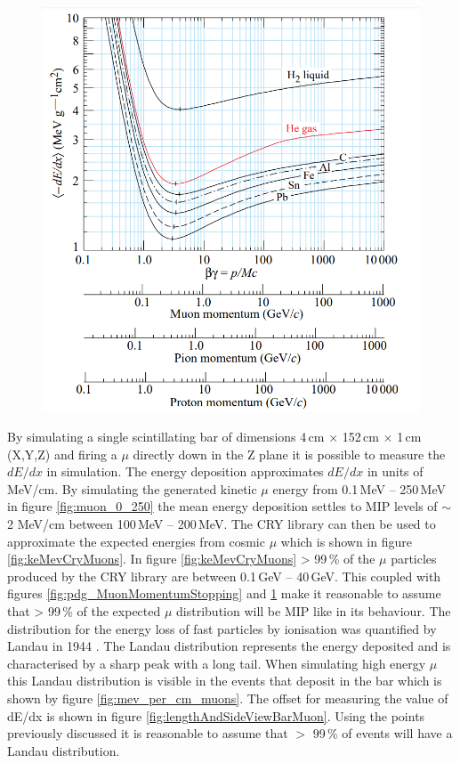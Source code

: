 \begin{figure}[!h]
 \centering
 \includegraphics[width=0.7\linewidth]{Chapter4/Figs/Raster/pdg_dedx_gcm2.png}
 \label{fig:pdg_dedx_gcm2}
\end{figure}

By simulating a single scintillating bar of dimensions 4\,cm $\times$ 152\,cm $\times$ 1\,cm (X,Y,Z) and firing a $\mu$ directly down in the Z plane it is possible to measure the $dE/dx$ in simulation. The energy deposition approximates $dE/dx$ in units of MeV/cm. By simulating the generated kinetic $\mu$ energy from 0.1\,MeV -- 250\,MeV in figure \ref{fig:muon_0_250} the mean energy deposition settles to MIP levels of $\sim$ 2 MeV/cm between 100\,MeV -- 200\,MeV. The CRY library \cite{ieee_cry_2007} can then be used to approximate the expected energies from cosmic $\mu$ which is shown in figure \ref{fig:keMevCryMuons}. In figure \ref{fig:keMevCryMuons} > 99\,\% of the $\mu$ particles produced by the CRY library are between 0.1\,GeV -- 40\,GeV. This coupled with figures \ref{fig:pdg_MuonMomentumStopping} and \ref{fig:pdg_dedx_gcm2} make it reasonable to assume that > 99\,\% of the expected $\mu$ distribution will be MIP like in its behaviour. The distribution for the energy loss of fast particles by ionisation was quantified by Landau in 1944 \cite{landau1944energy}. The Landau distribution represents the energy deposited and is characterised by a sharp peak with a long tail. When simulating high energy $\mu$ this Landau distribution is visible in the events that deposit in the bar which is shown by figure \ref{fig:mev_per_cm_muons}. The offset for measuring the value of dE/dx is shown in figure \ref{fig:lengthAndSideViewBarMuon}. Using the points previously discussed it is reasonable to assume that $>$ 99\,\% of events will have a Landau distribution. %

